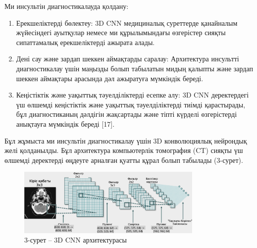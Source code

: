 \begin{multicols}{2}
Ми инсультін диагностикалауда қолдану:

\begin{enumerate}
\def\labelenumi{\arabic{enumi}.}
\item
  Ерекшеліктерді бөлектеу: 3D CNN медициналық суреттерде қанайналым
  жүйесіндегі ауытқулар немесе ми құрылымындағы өзгерістер сияқты
  сипаттамалық ерекшеліктерді ажырата алады.
\item
  Дені сау және зардап шеккен аймақтарды саралау: Архитектура инсультті
  диагностикалау үшін маңызды болып табылатын мидың қалыпты және зардап
  шеккен аймақтары арасында дәл ажыратуға мүмкіндік береді.
\item
  Кеңістіктік және уақыттық тәуелділіктерді есепке алу: 3D CNN
  деректердегі үш өлшемді кеңістіктік және уақыттық тәуелділіктерді
  тиімді қарастырады, бұл диагностиканың дәлдігін жақсартады және тіпті
  күрделі өзгерістерді анықтауға мүмкіндік береді {[}17{]}.
\end{enumerate}

Бұл жұмыста ми инсультін диагностикалау үшін 3D конволюциялық нейрондық
желі қолданылды. Бұл архитектура компьютерлік томография (CT) сияқты үш
өлшемді деректерді өңдеуге арналған қуатты құрал болып табылады
(3-сурет).
\end{multicols}

\begin{figure}[H]
	\centering
	\includegraphics[width=0.8\textwidth]{assets/3}
	\caption*{3-сурет -- 3D CNN архитектурасы}
\end{figure}


